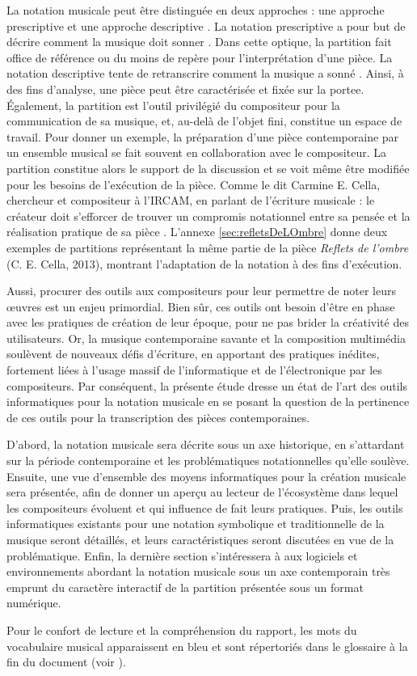 La notation musicale peut être distinguée en deux approches : une approche prescriptive et une approche descriptive \cite{battier2015}.
La notation prescriptive a pour but de décrire \og comment la musique doit sonner \fg.
Dans cette optique, la partition fait office de référence ou du moins de repère pour l'interprétation d'une pièce. 
La notation descriptive tente de retranscrire \og comment la musique a sonné \fg.
Ainsi, à des fins d'analyse, une pièce peut être caractérisée et fixée sur la \gls{portee}.
Également, la partition est l'outil privilégié du compositeur pour la communication de sa musique, et, au-delà de l'objet fini, constitue un espace de travail.
Pour donner un exemple, la préparation d'une pièce contemporaine par un ensemble musical se fait souvent en collaboration avec le compositeur. La partition constitue alors le support de la discussion et se voit même être modifiée pour les besoins de l'exécution de la pièce. Comme le dit Carmine E. Cella, chercheur et compositeur à l'IRCAM, en parlant de l'écriture musicale : \og le créateur doit s'efforcer de trouver un compromis notationnel entre sa pensée et la réalisation pratique de sa pièce \fg. L'annexe \ref{sec:refletsDeLOmbre} donne deux exemples de partitions représentant la même partie de la pièce \textit{Reflets de l'ombre} (C. E. Cella, 2013), montrant l'adaptation de la notation à des fins d'exécution.

Aussi, procurer des outils aux compositeurs pour leur permettre de noter leurs œuvres est un enjeu primordial. Bien sûr, ces outils ont besoin d'être en phase avec les pratiques de création de leur époque, pour ne pas brider la créativité des utilisateurs.
Or, la musique contemporaine savante et la composition multimédia soulèvent de nouveaux défis d'écriture, en apportant des pratiques inédites, fortement liées à l'usage massif de l'informatique et de l'électronique par les compositeurs. Par conséquent, la présente étude dresse un état de l'art des outils informatiques pour la notation musicale en se posant la question de la pertinence de ces outils pour la transcription des pièces contemporaines.

D'abord, la notation musicale sera décrite sous un axe historique, en s'attardant sur la période  contemporaine et les problématiques notationnelles qu'elle soulève. Ensuite, une vue d'ensemble des moyens informatiques pour la création musicale sera présentée, afin de donner un aperçu au lecteur de l'écosystème dans lequel les compositeurs évoluent et qui influence de fait leurs pratiques. Puis, les outils informatiques existants pour une notation symbolique et traditionnelle de la musique seront détaillés, et leurs caractéristiques seront discutées en vue de la problématique. Enfin, la dernière section s'intéressera à aux logiciels et environnements abordant la notation musicale sous un axe contemporain très emprunt du caractère interactif de la partition présentée sous un format numérique.

Pour le confort de lecture et la compréhension du rapport, les mots du vocabulaire musical apparaissent en bleu et sont répertoriés dans le glossaire à la fin du document (voir ).


